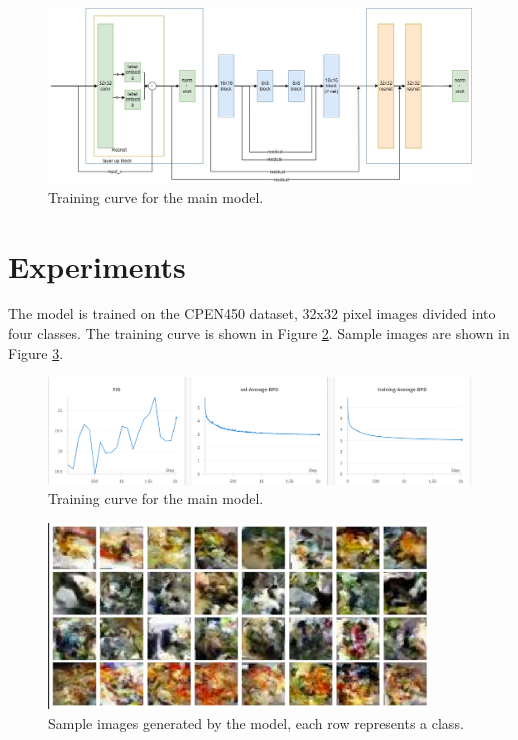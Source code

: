 \documentclass{article}
\begin{document}
\begin{figure}
    \centering
    \includegraphics[width=1.0\textwidth]{report_data/o-dia.jpg}
    \caption{ Training curve for the main model.}
    \label{fig:o-dia}
    \end{figure}

\section{Experiments}
The model is trained on the CPEN450 dataset, 32x32 pixel images divided into four classes. The training curve is shown in Figure \ref{fig:o-train}. Sample images are shown in Figure \ref{fig:o-sample}.

\begin{figure}
    \centering
    \includegraphics[width=1.0\textwidth]{report_data/o-train.png}
    \caption{ Training curve for the main model.}
    \label{fig:o-train}
  \end{figure}

  \begin{figure}
    \centering
    \includegraphics[width=0.9\textwidth]{report_data/o-images.png}
    \caption{ Sample images generated by the model, each row represents a class.}
    \label{fig:o-sample}
  \end{figure}
\end{document}
